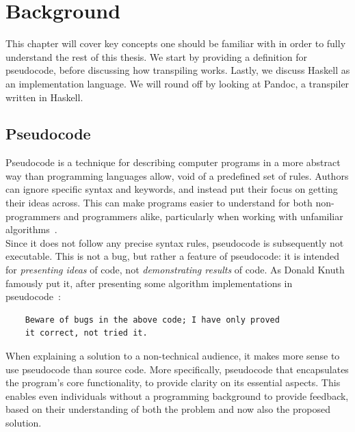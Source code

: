 \chapter{Background}

This chapter will cover key concepts one should be familiar with in order to fully understand the rest of this thesis. We start by providing a definition for pseudocode, before discussing how transpiling works. Lastly, we discuss Haskell as an implementation language. We will round off by looking at Pandoc, a transpiler written in Haskell.

\section{Pseudocode}

Pseudocode is a technique for describing computer programs in a more abstract way than programming languages allow, void of a predefined set of rules. Authors can ignore specific syntax and keywords, and instead put their focus on getting their ideas across. This can make programs easier to understand for both non-programmers and programmers alike, particularly when working with unfamiliar algorithms~\cite{whatIsPseudocode}. \\

Since it does not follow any precise syntax rules, pseudocode is subsequently not executable. This is not a bug, but rather a feature of pseudocode: it is intended for \textit{presenting ideas} of code, not \textit{demonstrating results} of code. As Donald Knuth famously put it, after presenting some algorithm implementations in pseudocode~\cite{famousKnuthQuote}:

\begin{verbatim}
    Beware of bugs in the above code; I have only proved
    it correct, not tried it.
\end{verbatim}


When explaining a solution to a non-technical audience, it makes more sense to use pseudocode than source code. More specifically, pseudocode that encapsulates the program's core functionality, to provide clarity on its essential aspects. This enables even individuals without a programming background to provide feedback, based on their understanding of both the problem and now also the proposed solution. \\

